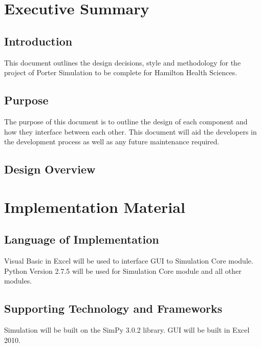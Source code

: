 \documentclass[paper=letter, fontsize=10pt]{scrartcl}
\numberwithin{equation}{section}		%
\numberwithin{figure}{section}			%
\numberwithin{table}{section}				%
\begin{document}
\section{Executive Summary}
\subsection{Introduction}
This document outlines the design decisions, style and methodology for the project of Porter Simulation to be complete for Hamilton Health Sciences.
\subsection{Purpose}
The purpose of this document is to outline the design of each component and how they interface between each other. This document will aid the developers in the development process as well as any future maintenance required.
\subsection{Design Overview}
\section{Implementation Material}
\subsection{Language of Implementation}
Visual Basic in Excel will be used to interface GUI to Simulation Core module. Python Version 2.7.5 will be used for Simulation Core module and all other modules.
\subsection{Supporting Technology and Frameworks}
Simulation will be built on the SimPy 3.0.2 library. GUI will be built in Excel 2010. 
\newpage
\end{document}
